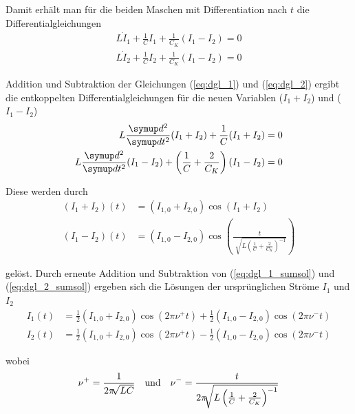 Damit erhält man für die beiden Maschen mit Differentiation nach $t$ die Differentialgleichungen
\begin{align}  
    L {\dot{I}}_{1} + \frac{1}{C} I_{1} + \frac{1}{C_{K}} (I_{1} - I_{2})  = 0 \label{eq:dgl_1} \\
    L {\dot{I}}_{2} + \frac{1}{C} I_{2} + \frac{1}{C_{K}} (I_{1} - I_{2})  = 0 \label{eq:dgl_2}
\end{align}

Addition und Subtraktion der Gleichungen (\ref{eq:dgl_1}) und (\ref{eq:dgl_2}) ergibt die entkoppelten 
Differentialgleichungen für die neuen Variablen ($I_{1}+I_{2}$) und ($I_{1}-I_{2}$)
\begin{align} 
    L \frac {\dif{^2}} {\dif{t^2}} (I_{1} + I_{2}) + \frac{1}{C} (I_{1} + I_{2})  = 0 \label{eq:dgl_1_entk} \\
    L \frac {\dif{^2}} {\dif{t^2}} (I_{1} - I_{2}) + \left( \frac{1}{C} + \frac{2}{C_{K}} \right) (I_{1} - I_{2})  = 0 \label{eq:dgl_2_entk}
\end{align}

Diese werden durch
\begin{align}
    (I_{1} + I_{2})(t) &= (I_{1,0} + I_{2,0}) \cos(I_{1} + I_{2}) \label{eq:dgl_1_sumsol} \\
    (I_{1} - I_{2})(t) &= (I_{1,0} - I_{2,0}) \cos \left( \frac {t} {{\sqrt [] {L \left( \frac{1}{C} + \frac{2}{C_{K}} \right)^{-1} }}} \right) \label{eq:dgl_2_sumsol}
\end{align}

gelöst. Durch erneute Addition und Subtraktion von (\ref{eq:dgl_1_sumsol}) und (\ref{eq:dgl_2_sumsol}) ergeben sich die Lösungen 
der ursprünglichen Ströme $I_{1}$ und $I_{2}$
\begin{align}
    I_{1}(t) &= \frac{1}{2} (I_{1,0} + I_{2,0}) \cos(2 \pi \nu^+ t)  +  \frac{1}{2} (I_{1,0} - I_{2,0}) \cos(2 \pi \nu^- t) \label{eq:dgl_1_sol} \\
    I_{2}(t) &= \frac{1}{2} (I_{1,0} + I_{2,0}) \cos(2 \pi \nu^+ t)  -  \frac{1}{2} (I_{1,0} - I_{2,0}) \cos(2 \pi \nu^- t) \label{eq:dgl_2_sol} 
\end{align}

wobei 
\begin{align}
    \nu^+ &= \frac {1} {2 \pi \sqrt[]{LC}} & \mbox{\centering und} && \nu^- = \frac {t} {2 \pi \sqrt [] {L \left( \frac{1}{C} + \frac{2}{C_{K}} \right)^{-1} }}
\end{align}

